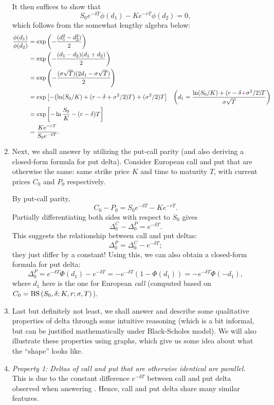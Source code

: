 \begin{enumerate}
\begin{pf}
It then suffices to show that
\[
S_0e^{-\delta T}\phi(d_1)-Ke^{-rT}\phi(d_2)=0,
\]
which follows from the somewhat lengthy algebra below:
\begin{align*}
\frac{\phi(d_1)}{\phi(d_2)}&=\exp\qty(-\frac{(d_1^2-d_2^2)}{2})\\
&=\exp\qty(-\frac{(d_1-d_2)(d_1+d_2)}{2})\\
&=\exp\qty(-\frac{(\sigma\sqrt{T})(2d_1-\sigma\sqrt{T})}{2})\\
&=\exp\qty[-\qty(\ln(S_0/K)+(r-\delta+\sigma^2/2)T)+(\sigma^{2}/2)T]&
\qty(d_1=\frac{\ln(S_0/K)+(r-\delta{\color{violet}+}\sigma^2/2)T}{\sigma\sqrt{T}}) \\
&=\exp\qty[-\ln\frac{S_0}{K}-(r-\delta)T] \\
&=\frac{Ke^{-rT}}{S_0e^{-\delta T}}.
\end{align*}
\end{pf}

\item \label{it:call-put-delta-relate} Next, we shall answer
 by utilizing the put-call parity (and also
deriving a closed-form formula for put delta).  Consider European call and put
that are otherwise the same: same strike price \(K\) and time to maturity
\(T\), with current prices \(C_0\) and \(P_0\) respectively.

By put-call parity,
\[
C_0-P_0=S_0e^{-\delta T}-Ke^{-rT}.
\]
Partially differentiating both sides with respect to \(S_0\) gives
\[
\Delta_0^{C}-\Delta_0^{P}=e^{-\delta T}.
\]
This suggests the relationship between call and put deltas:
\[
\boxed{\Delta_0^P=\Delta_0^C-e^{-\delta T}};
\]
they just differ by a constant! Using this, we can also obtain a closed-form
formula for put delta:
\[
\Delta_0^P=e^{-\delta T}\Phi(d_1)-e^{-\delta T}
=-e^{-\delta T}(1-\Phi(d_1))
=\boxed{-e^{-\delta T}\Phi(-d_1)},
\]
where \(d_1\) here is the one for European \emph{call} (computed based on
\(C_0=\operatorname{BS}\qty(S_0,\delta;K,r;\sigma,T)\)).

\item Last but definitely not least, we shall answer 
and describe some qualitative properties of delta through some intuitive
reasoning (which is a bit informal, but can be justified mathematically under
Black-Scholes model). We will also illustrate these properties using graphs,
which give us some idea about what the ``shape'' looks like.

\item \label{it:cp-delta-parallel} \emph{Property 1: Deltas of call and put
that are otherwise identical are parallel.} This is due to the constant
difference \(e^{-\delta T}\) between call and put delta observed when answering
. Hence, call and put delta share many similar
features.


\end{enumerate}
